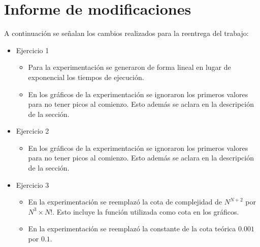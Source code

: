 \section*{Informe de modificaciones}

A continuación se señalan los cambios realizados para la reentrega del trabajo:

\begin{itemize}
	\item{
		Ejercicio 1
		\begin{itemize}
			\item Para la experimentación se generaron de forma lineal en lugar
			de exponencial los tiempos de ejecución.
			\item En los gráficos de la experimentación se ignoraron los primeros
			valores para no tener picos al comienzo. Esto además se aclara en la
			descripción de la sección.
		\end{itemize}
	}
	\item{
		Ejercicio 2
		\begin{itemize}
			\item En los gráficos de la experimentación se ignoraron los primeros
			valores para no tener picos al comienzo. Esto además se aclara en la
			descripción de la sección.
		\end{itemize}
	}
	\item{
		Ejercicio 3
		\begin{itemize}
			\item En la experimentación se reemplazó la cota de complejidad de $N^{N+2}$ por $N^3 \times N!$. Esto incluye la función utilizada como cota en los gráficos.
			\item En la experimentación se reemplazó la constante de la cota teórica $0.001$ por $0.1$.
		\end{itemize}
	}
\end{itemize}
